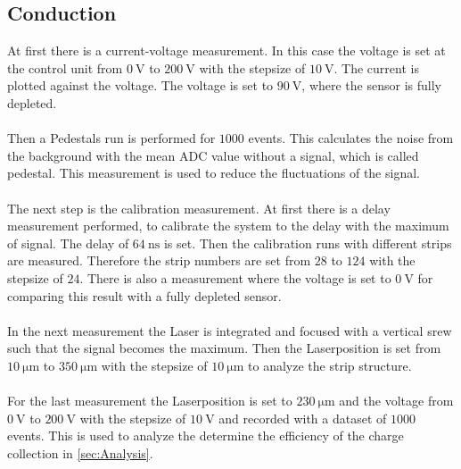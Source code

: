 \subsection{Conduction}
\label{sec:conduction}
At first there is a current-voltage measurement. In this case the voltage is set at the control unit from $\SI{0}{\volt}$ to $\SI{200}{\volt}$ with the stepsize of $\SI{10}{\volt}$. The current is plotted against the voltage. The voltage is set to $\SI{90}{\volt}$, where the sensor is fully depleted.\\\\
Then a Pedestals run is performed for $\num{1000}$ events. This calculates the noise from the background with the mean ADC value without a signal, which is called pedestal. This measurement is used to reduce the fluctuations of the signal.\\\\
The next step is the calibration measurement. At first there is a delay measurement performed, to calibrate the system to the delay with the maximum of signal. The delay of $\SI{64}{\nano\second}$ is set. Then the calibration runs with different strips are measured. Therefore the strip numbers are set from $\num{28}$ to $\num{124}$ with the stepsize of $\num{24}$. There is also a measurement where the voltage is set to $\SI{0}{\volt}$ for comparing this result with a fully depleted sensor.\\\\
In the next measurement the Laser is integrated and focused with a vertical srew such that the signal becomes the maximum. Then the Laserposition is set from $\SI{10}{\micro\meter}$ to $\SI{350}{\micro\meter}$ with the stepsize of $\SI{10}{\micro\meter}$ to analyze the strip structure.\\\\
For the last measurement the Laserposition is set to $\SI{230}{\micro\meter}$ and the voltage from $\SI{0}{\volt}$ to $\SI{200}{\volt}$ with the stepsize of $\SI{10}{\volt}$ and recorded with a dataset of $\num{1000}$ events. This is used to analyze the determine the efficiency of the charge collection in \autoref{sec:Analysis}.

